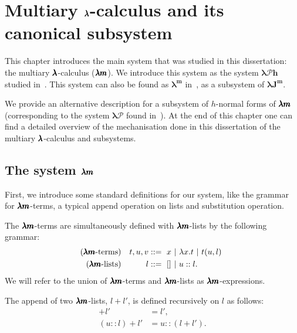 \chapter{Multiary $\pmb{\lambda}$-calculus and its canonical subsystem}
\label{c:multiary}

This chapter introduces the main system that was studied in this dissertation: the multiary $\pmb{\lambda}$-calculus ($\pmb{\lambda m}$).
We introduce this system as the system $\pmb{\lambda \mathcal{P}h}$ studied in~\cite[Chapter~3]{JCES2002}.
This system can also be found as $\pmb{\lambda^m}$ in~\cite[Section~3]{JCESLuis}, as a subsystem of $\pmb{\lambda J^m}$.

We provide an alternative description for a subsystem of $h$-normal forms of $\pmb{\lambda m}$ (corresponding to the system $\pmb{\lambda \mathcal{P}}$ found in~\cite[Chapter~3]{JCES2002}).
At the end of this chapter one can find a detailed overview of the mechanisation done in this dissertation of the multiary $\pmb{\lambda}$-calculus and subsystems.

\section{The system $\pmb{\lambda m}$}

First, we introduce some standard definitions for our system, like the grammar for $\pmb{\lambda m}$-terms, a typical append operation on lists and substitution operation.

\begin{definition}
  The $\pmb{\lambda m}$-terms are simultaneously defined with $\pmb{\lambda m}$-lists by the following grammar:  
  \begin{align*} 
    (\pmb{\lambda m} \text{-terms}) && t, u, v &::= \ x \ | \ \lambda x . t \ | \ t(u, l) \ \\
    (\pmb{\lambda m} \text{-lists}) && l       &::= \ []\  | \ u :: l.
  \end{align*}
  We will refer to the union of $\pmb{\lambda m}$-terms and $\pmb{\lambda m}$-lists as $\pmb{\lambda m}$-expressions.
\end{definition}

\begin{definition}[Append]
  The append of two $\pmb{\lambda m}$-lists, $l + l'$, is defined recursively on $l$ as follows:
  \begin{align*}
    [] + l'     &= l', \\
    (u::l) + l' &= u::(l + l').
  \end{align*}
\end{definition}

